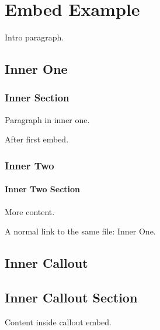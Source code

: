 \section{Embed Example}\label{embed-example}

Intro paragraph.

\subsection{Inner One}\label{embed-inner-1-1-inner-one}

\subsubsection{Inner Section}\label{embed-inner-1-1-inner-section}

Paragraph in inner one.

After first embed.

\subsubsection{Inner Two}\label{embed-inner-2-1-inner-two}

\paragraph{Inner Two Section}\label{embed-inner-2-1-inner-two-section}

More content.

A normal link to the same file: Inner One.

\begin{tcolorbox}[breakable,colback=ocGryBack,colframe=ocGryFrame,coltitle=ocGryTitle,left=3mm,boxed title style={left=1mm},title={\hspace*{-2.5mm}\iconInfo\; Callout with embed}]

\section*{Inner Callout}\label{embed-inner-3-1-inner-callout}

\subsection*{Inner Callout
Section}\label{embed-inner-3-1-inner-callout-section}

Content inside callout embed.

\end{tcolorbox}
